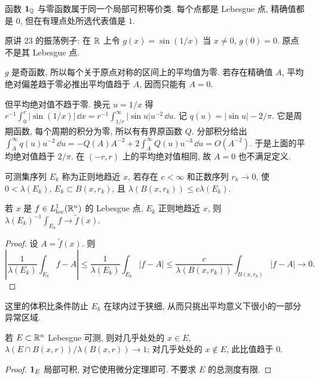 \begin{example}
函数 $\mathbf 1_{\mathbb Q}$ 与零函数属于同一个局部可积等价类. 每个点都是 Lebesgue 点, 精确值都是 $0$, 但在有理点处所选代表值是 $1$.
\end{example}

\begin{example}
原讲 23 的振荡例子: 在 $\mathbb R$ 上令 $g(x)=\sin(1/x)$ 当 $x\ne0$, $g(0)=0$. 原点不是其 Lebesgue 点.
\end{example}
\begin{solution}
$g$ 是奇函数, 所以每个关于原点对称的区间上的平均值为零. 若存在精确值 $A$, 平均绝对偏差趋于零必推出平均值趋于 $A$, 因而只能有 $A=0$.

但平均绝对值不趋于零. 换元 $u=1/x$ 得
$r^{-1}\int_0^r|\sin(1/x)|\,\dd x=r^{-1}\int_{1/r}^\infty|\sin u|u^{-2}\,\dd u$.
记 $q(u)=|\sin u|-2/\pi$. 它是周期函数, 每个周期的积分为零, 所以有有界原函数 $Q$. 分部积分给出
$\int_A^\infty q(u)u^{-2}\,\dd u
=-Q(A)A^{-2}+2\int_A^\infty Q(u)u^{-3}\,\dd u=O(A^{-2})$.
于是上面的平均绝对值趋于 $2/\pi$. 在 $(-r,r)$ 上的平均绝对值相同, 故 $A=0$ 也不满足定义.
\end{solution}

\begin{definition}[正则地趋近一点]
可测集序列 $E_k$ 称为正则地趋近 $x$, 若存在 $c<\infty$ 和正数序列 $r_k\to0$, 使 $0<\lambda(E_k)$, $E_k\subset B(x,r_k)$, 且 $\lambda(B(x,r_k))\le c\lambda(E_k)$.
\end{definition}

\begin{theorem}\label{ra:c8:regular}
若 $x$ 是 $f\in L^1_{\mathrm{loc}}(\mathbb R^n)$ 的 Lebesgue 点, $E_k$ 正则地趋近 $x$, 则 $\lambda(E_k)^{-1}\int_{E_k}f\to\widetilde f(x)$.
\end{theorem}
\begin{proof}
设 $A=\widetilde f(x)$. 则
\[
 \left|\frac1{\lambda(E_k)}\int_{E_k}f-A\right|
 \le\frac1{\lambda(E_k)}\int_{E_k}|f-A|
 \le\frac c{\lambda(B(x,r_k))}\int_{B(x,r_k)}|f-A|\longrightarrow0.
\]
\end{proof}

这里的体积比条件防止 $E_k$ 在球内过于狭细, 从而只挑出平均意义下很小的一部分异常区域.

\begin{corollary}\label{ra:c8:density}
若 $E\subset\mathbb R^n$ Lebesgue 可测, 则对几乎处处的 $x\in E$,
$\lambda(E\cap B(x,r))/\lambda(B(x,r))\to1$;
对几乎处处的 $x\notin E$, 此比值趋于 $0$.
\end{corollary}
\begin{proof}
$\mathbf 1_E$ 局部可积, 对它使用微分定理即可. 不要求 $E$ 的总测度有限.
\end{proof}

